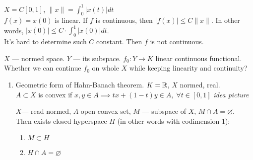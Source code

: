  \begin{example}
   $X = C[0,1]$, $\|x\| = \int_{0}^{1}  \left| x(t) \right| dt $ \\
   $f(x) = x(0)$ is linear. If $f$ is continuous, then $\left| f(x) \right|  \le  C\|x\|$. In other words, $\left| x(0) \right| \le C \cdot \int_{0}^{1} \left| x(0) \right| dt$.\\
   It's hard to determine such $C$ constant. Then  $f$ is not continuous.
 \end{example}

 \hr



 \begin{theorem}
   $X$ --- normed space. $Y$ --- its subspace. $f_0: Y \to K$ linear continuous functional.\\
   Whether we can continue $f_0$ on whole $X$ while keeping linearity and continuity?
   \begin{enumerate}
     \item Geometric form of Hahn-Banach theorem. $K = \mathbb{R}$, $X$ normed, real.\\
       $A \subset X$ is convex if $x,y \in  A \implies t x + (1 - t)y \in  A, \; \forall t \in  [0,1]$ 
       \textit{idea picture}


       $X$--- read normed, $A$ open convex set, $M$ --- subspace of $X$, $M \cap A = \varnothing$.\\
       Then exists closed hyperspace $H$ (in other words with codimension 1):
       \begin{enumerate}
         \item $M \subset H$ 
         \item $H \cap A = \varnothing$
       \end{enumerate}
   \end{enumerate}
 \end{theorem}


